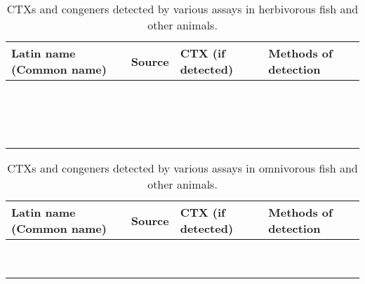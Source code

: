 \begin{sidewaystable}[!htbp]
\caption{CTXs and congeners detected by various assays in herbivorous fish and other animals.}
\begin{tabular}{ |  p{4.5cm} | p{5cm} | p{4.5cm} | p{5cm} | }
\hline
\textbf{Latin name (Common name)} & \textbf{Source} & \textbf{CTX (if detected)} & \textbf{Methods of detection} \\
\hline
  &  &  & \\
\hline
  &  &  & \\
\hline
  &  &  & \\
\hline
  &  &  & \\
\hline
  &  &  & \\
\hline
  &  &  & \\
\hline
  &  &  & \\
\hline
  &  &  & \\
\hline
  &  &  & \\
\hline
  &  &  & \\
\hline
  &  &  & \\
\hline
  &  &  & \\
\hline
  &  &  & \\
\hline
  &  &  & \\
\hline
  &  &  & \\
\hline
  &  &  & \\
\hline
\end{tabular}
\end{sidewaystable}

\begin{sidewaystable}[!htbp]
\caption{CTXs and congeners detected by various assays in omnivorous fish and other animals.}
\begin{tabular}{ |  p{4.5cm} | p{5cm} | p{4.5cm} | p{5cm} | }
\hline
\textbf{Latin name (Common name)} & \textbf{Source} & \textbf{CTX (if detected)} & \textbf{Methods of detection} \\
\hline
  &  &  & \\
\hline
  &  &  & \\
\hline
  &  &  & \\
\hline
  &  &  & \\
\hline
  &  &  & \\
\hline
  &  &  & \\
\hline
  &  &  & \\
\hline
  &  &  & \\
\hline
  &  &  & \\
\hline
\end{tabular}
\end{sidewaystable}

